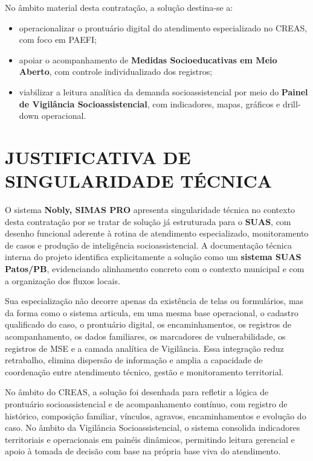 \documentclass[12pt,a4paper]{article}
\begin{document}
No âmbito material desta contratação, a solução destina-se a:

\begin{itemize}[leftmargin=1.5cm]
\item operacionalizar o prontuário digital do atendimento especializado no CREAS, com foco em PAEFI;
\item apoiar o acompanhamento de \textbf{Medidas Socioeducativas em Meio Aberto}, com controle individualizado dos registros;
\item viabilizar a leitura analítica da demanda socioassistencial por meio do \textbf{Painel de Vigilância Socioassistencial}, com indicadores, mapas, gráficos e drill-down operacional.
\end{itemize}

\section{JUSTIFICATIVA DE SINGULARIDADE TÉCNICA}

O sistema \textbf{Nobly, SIMAS PRO} apresenta singularidade técnica no contexto desta contratação por se tratar de solução já estruturada para o \textbf{SUAS}, com desenho funcional aderente à rotina de atendimento especializado, monitoramento de casos e produção de inteligência socioassistencial. A documentação técnica interna do projeto identifica explicitamente a solução como um \textbf{sistema SUAS Patos/PB}, evidenciando alinhamento concreto com o contexto municipal e com a organização dos fluxos locais.

Sua especialização não decorre apenas da existência de telas ou formulários, mas da forma como o sistema articula, em uma mesma base operacional, o cadastro qualificado do caso, o prontuário digital, os encaminhamentos, os registros de acompanhamento, os dados familiares, os marcadores de vulnerabilidade, os registros de MSE e a camada analítica de Vigilância. Essa integração reduz retrabalho, elimina dispersão de informação e amplia a capacidade de coordenação entre atendimento técnico, gestão e monitoramento territorial.

No âmbito do CREAS, a solução foi desenhada para refletir a lógica de prontuário socioassistencial e de acompanhamento contínuo, com registro de histórico, composição familiar, vínculos, agravos, encaminhamentos e evolução do caso. No âmbito da Vigilância Socioassistencial, o sistema consolida indicadores territoriais e operacionais em painéis dinâmicos, permitindo leitura gerencial e apoio à tomada de decisão com base na própria base viva do atendimento.
\end{document}
